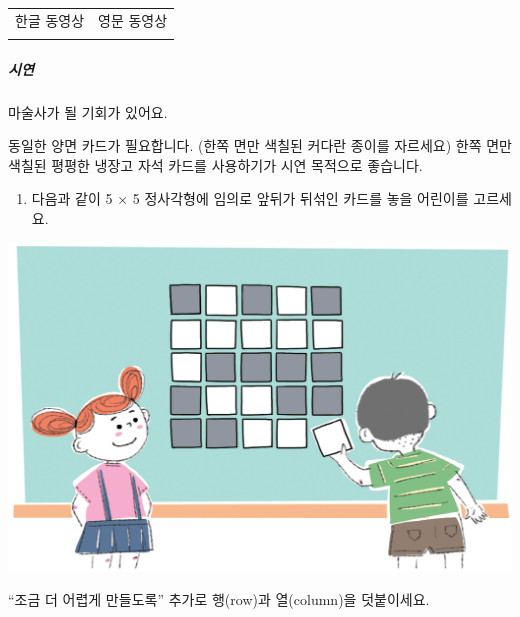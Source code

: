 \documentclass[]{article}
\begin{document}
\begin{longtable}[c]{@{}ll@{}}
\toprule
\begin{minipage}[t]{0.47\columnwidth}\raggedright\strut
한글 동영상
\strut\end{minipage} &
\begin{minipage}[t]{0.47\columnwidth}\raggedright\strut
영문 동영상
\strut\end{minipage}\tabularnewline
\begin{minipage}[t]{0.47\columnwidth}\raggedright\strut
\strut\end{minipage} &
\begin{minipage}[t]{0.47\columnwidth}\raggedright\strut
\strut\end{minipage}\tabularnewline
\bottomrule
\end{longtable}

\subparagraph{시연}\label{section-67}

마술사가 될 기회가 있어요.

동일한 양면 카드가 필요합니다. (한쪽 면만 색칠된 커다란 종이를 자르세요)
한쪽 면만 색칠된 평평한 냉장고 자석 카드를 사용하기가 시연 목적으로
좋습니다.

\begin{enumerate}
\itemsep1pt\parskip0pt
\item
  다음과 같이 5 × 5 정사각형에 임의로 앞뒤가 뒤섞인 카드를 놓을 어린이를
  고르세요.
\end{enumerate}

\includegraphics{csunplugged/01-part/img/ch04-checksum/04-checksum-01-magician-01.png}

``조금 더 어렵게 만들도록'' 추가로 행(row)과 열(column)을 덧붙이세요.
\end{document}
